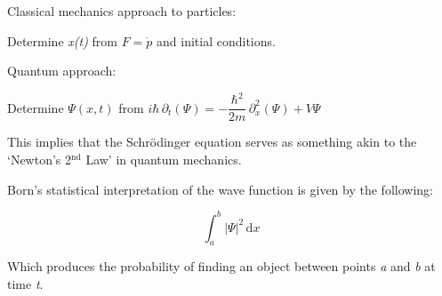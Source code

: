 Classical mechanics approach to particles:

Determine \textit{x(t)} from $F = \dot{p}$ and initial conditions.

\bigskip \bigskip

Quantum approach:

Determine $\Psi(x,t)$ from $i\hbar \, \partial_{t}(\Psi) =
- \dfrac{\hbar^{2}}{2m} \, \partial_{x}^{2}(\Psi)
+ V\Psi$

\bigskip

This implies that the Schrödinger equation serves as something akin to the \\
`Newton's 2$^{\text{nd}}$ Law' in quantum mechanics.

\bigskip \bigskip

Born's statistical interpretation of the wave function is given by the
following:

\[
    \int_{a}^{b} |\Psi|^{2} \, \text{d}x
\]

Which produces the probability of finding an object between points
\textit{a} and \textit{b} at time \textit{t}.

\bigskip \bigskip

